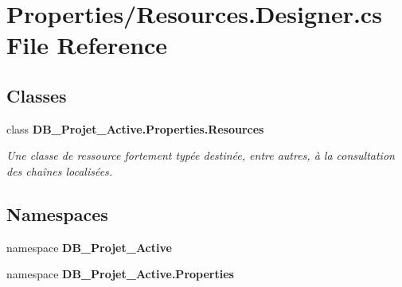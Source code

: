 \section{Properties/\+Resources.Designer.\+cs File Reference}
\label{_resources_8_designer_8cs}
\subsection*{Classes}
\begin{DoxyCompactItemize}
\item 
class \textbf{ D\+B\+\_\+\+Projet\+\_\+\+Active.\+Properties.\+Resources}
\begin{DoxyCompactList}\small\item\em Une classe de ressource fortement typée destinée, entre autres, à la consultation des chaînes localisées. \end{DoxyCompactList}\end{DoxyCompactItemize}
\subsection*{Namespaces}
\begin{DoxyCompactItemize}
\item 
namespace \textbf{ D\+B\+\_\+\+Projet\+\_\+\+Active}
\item 
namespace \textbf{ D\+B\+\_\+\+Projet\+\_\+\+Active.\+Properties}
\end{DoxyCompactItemize}
